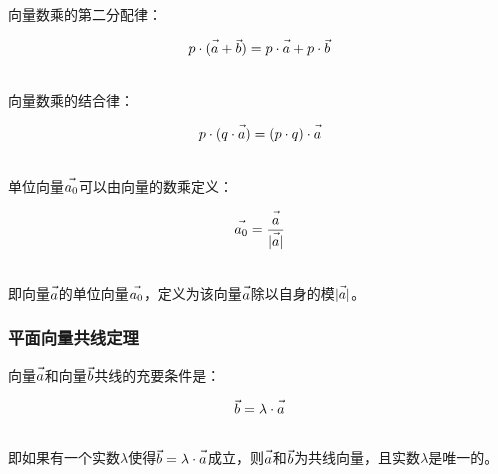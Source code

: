 \documentclass[UTF8]{ctexart}
\let\nvec\vec
\def\vec#1{\nvec{\vphantom b\smash{#1}}}
\begin{document}
    向量数乘的第二分配律：
    \begin{large}
        \begin{equation*}
            p\cdot(\vec{a}+\vec{b})=p\cdot\vec{a}+p\cdot\vec{b}
        \end{equation*}
    \end{large}\\
    向量数乘的结合律：
    \begin{large}
        \begin{equation*}
            p\cdot(q\cdot\vec{a})=(p\cdot q)\cdot\vec{a}
        \end{equation*}
    \end{large}\\
    单位向量$\vec{a_0}$可以由向量的数乘定义：
    \begin{large}
        \begin{equation*}
            \vec{a_0}=\frac{\vec{a}}{|\vec{a}|}
        \end{equation*}
    \end{large}\\
    即向量$\vec{a}$的单位向量$\vec{a_0}$，定义为该向量$\vec{a}$除以自身的模$|\vec{a}|$。

\newpage

\subsubsection{平面向量共线定理}
    向量$\vec{a}$和向量$\vec{b}$共线的充要条件是：
    \begin{large}
        \begin{equation*}
            \vec{b}=\lambda\cdot\vec{a}
        \end{equation*}
    \end{large}\\
    即如果有一个实数$\lambda$使得$\vec{b}=\lambda\cdot\vec{a}$成立，则$\vec{a}$和$\vec{b}$为共线向量，且实数$\lambda$是唯一的。
\end{document}
